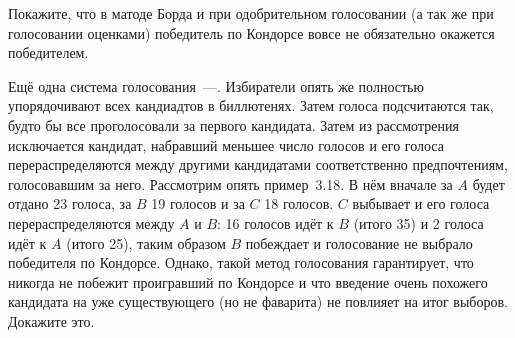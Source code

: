 \begin{exercise}
Покажите, что в матоде Борда и при одобрительном голосовании (а так же при голосовании оценками) победитель по Кондорсе вовсе не обязательно окажется победителем.
\end{exercise}

\begin{exercise}
Ещё одна система голосования~---. Избиратели опять же полностью упорядочивают всех кандиадтов в биллютенях. Затем голоса подсчитаются так, будто бы все проголосовали за первого кандидата. Затем из рассмотрения исключается кандидат, набравший меньшее число голосов и его голоса перераспределяются между другими кандидатами соответственно предпочтениям, голосовавшим за него. Рассмотрим опять пример~3.18. В нём вначале за $A$ будет отдано 23 голоса, за $B$ 19 голосов и за $C$ 18 голосов. $C$ выбывает и его голоса перераспределяются между $A$ и $B$: 16 голосов идёт к $B$ (итого 35) и 2 голоса идёт к $A$ (итого 25), таким образом $B$ побеждает и голосование не выбрало победителя по Кондорсе. Однако, такой метод голосования гарантирует, что никогда не побежит проигравший по Кондорсе и что введение очень похожего кандидата на уже существующего (но не фаварита) не повлияет на итог выборов. Докажите это.
\end{exercise}

